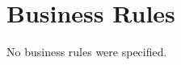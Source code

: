 \section{Business Rules}
	\begin{comment}
		$<$List any operating principles about the product, such as which individuals or 
		roles can perform which functions under specific circumstances. These are not 
		functional requirements in themselves, but they may imply certain functional 
		requirements to enforce the rules.$>$
	\end{comment}
	No business rules were specified.